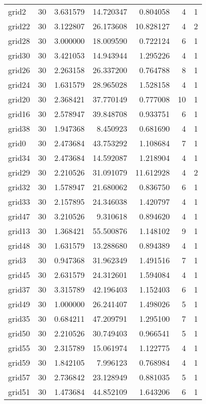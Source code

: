 \documentclass[../../../thesis.tex]{subfiles}
\begin{document}
\begin{longtable}{|l|r|r|r|r|r|r|}
grid2 & 30 & 3.631579 & 14.720347 & 0.804058 & 4 & 1 \\
grid22 & 30 & 3.122807 & 26.173608 & 10.828127 & 4 & 2 \\
grid28 & 30 & 3.000000 & 18.009590 & 0.722124 & 6 & 1 \\
grid30 & 30 & 3.421053 & 14.943944 & 1.295226 & 4 & 1 \\
grid26 & 30 & 2.263158 & 26.337200 & 0.764788 & 8 & 1 \\
grid24 & 30 & 1.631579 & 28.965028 & 1.528158 & 4 & 1 \\
grid20 & 30 & 2.368421 & 37.770149 & 0.777008 & 10 & 1 \\
grid16 & 30 & 2.578947 & 39.848708 & 0.933751 & 6 & 1 \\
grid38 & 30 & 1.947368 & 8.450923 & 0.681690 & 4 & 1 \\
grid0 & 30 & 2.473684 & 43.753292 & 1.108684 & 7 & 1 \\
grid34 & 30 & 2.473684 & 14.592087 & 1.218904 & 4 & 1 \\
grid29 & 30 & 2.210526 & 31.091079 & 11.612928 & 4 & 2 \\
grid32 & 30 & 1.578947 & 21.680062 & 0.836750 & 6 & 1 \\
grid33 & 30 & 2.157895 & 24.346038 & 1.420797 & 4 & 1 \\
grid47 & 30 & 3.210526 & 9.310618 & 0.894620 & 4 & 1 \\
grid13 & 30 & 1.368421 & 55.500876 & 1.148102 & 9 & 1 \\
grid48 & 30 & 1.631579 & 13.288680 & 0.894389 & 4 & 1 \\
grid3 & 30 & 0.947368 & 31.962349 & 1.491516 & 7 & 1 \\
grid45 & 30 & 2.631579 & 24.312601 & 1.594084 & 4 & 1 \\
grid37 & 30 & 3.315789 & 42.196403 & 1.152403 & 6 & 1 \\
grid49 & 30 & 1.000000 & 26.241407 & 1.498026 & 5 & 1 \\
grid35 & 30 & 0.684211 & 47.209791 & 1.295100 & 7 & 1 \\
grid50 & 30 & 2.210526 & 30.749403 & 0.966541 & 5 & 1 \\
grid55 & 30 & 2.315789 & 15.061974 & 1.122775 & 4 & 1 \\
grid59 & 30 & 1.842105 & 7.996123 & 0.768984 & 4 & 1 \\
grid57 & 30 & 2.736842 & 23.128949 & 0.881035 & 5 & 1 \\
grid51 & 30 & 1.473684 & 44.852109 & 1.643206 & 6 & 1 \\

\end{longtable}
\end{document}
